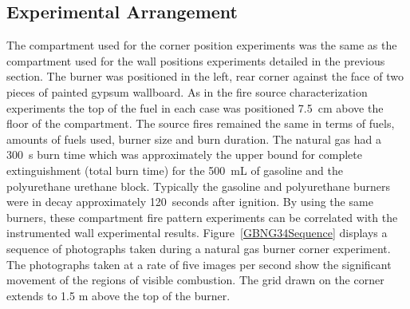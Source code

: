 \documentclass[twoside]{uocthesis}
\begin{document}
{\subsection{Experimental Arrangement}

The compartment used for the corner position experiments was the same as the compartment used for the wall positions experiments detailed in the previous section.  The burner was positioned in the left, rear corner against the face of two pieces of painted gypsum wallboard. As in the fire source characterization experiments the top of the fuel in each case was positioned 7.5~cm above the floor of the compartment. The source fires remained the same in terms of fuels, amounts of fuels used, burner size and burn duration.  The natural gas had a 300~s burn time which was approximately the upper bound for complete extinguishment (total burn time) for the 500~mL of gasoline and the polyurethane urethane block. Typically the gasoline and polyurethane burners were in decay approximately 120~seconds after ignition. By using the same burners, these compartment fire pattern experiments can be correlated with the instrumented wall experimental results.  Figure~\ref{GBNG34Sequence} displays a sequence of photographs taken during a natural gas burner corner experiment.  The photographs taken at a rate of five images per second show the significant movement of the regions of visible combustion.  The grid drawn on the corner extends to 1.5 m above the top of the burner. 

}
\end{document}
